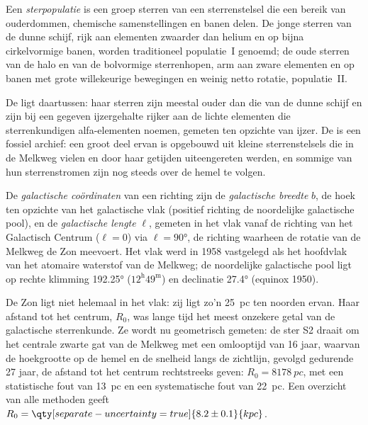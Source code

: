 \begin{definition}[Sterpopulatie]\label{def:b3:milky-way-galaxies:populations}
Een \emph{sterpopulatie} is een groep sterren
van een sterrenstelsel die een bereik van ouderdommen, chemische samenstellingen en
banen delen. De jonge sterren van de dunne schijf, rijk aan elementen zwaarder dan
helium en op bijna cirkelvormige banen, worden traditioneel
populatie~I genoemd; de oude sterren van de halo en van de bolvormige sterrenhopen, arm
aan zware elementen en op banen met grote willekeurige bewegingen en weinig netto rotatie,
populatie~II.
\end{definition}

De  ligt daartussen: haar sterren zijn meestal ouder dan die van
de dunne schijf en zijn bij een gegeven ijzergehalte rijker aan de lichte elementen
die sterrenkundigen alfa-elementen noemen, gemeten ten opzichte van ijzer. De
 is een
fossiel archief: een groot deel ervan is opgebouwd uit kleine sterrenstelsels die in
de Melkweg vielen en door haar getijden uiteengereten werden, en sommige van hun
sterrenstromen zijn nog steeds over de hemel te volgen.

\begin{definition}\label{def:b3:milky-way-galaxies:coordinates}
De \emph{galactische coördinaten} van een richting
zijn de \emph{galactische breedte} $b$, de hoek ten opzichte van het galactische vlak
(positief richting de noordelijke galactische pool), en de \emph{galactische
lengte} $\ell$, gemeten in het vlak vanaf de richting van het
Galactisch Centrum ($\ell = 0$) via $\ell = \ang{90}$, de richting
waarheen de rotatie van de Melkweg de Zon meevoert. Het vlak werd
in 1958 vastgelegd als het hoofdvlak van het atomaire waterstof van de Melkweg;
de noordelijke galactische pool ligt op rechte klimming \ang{192.25}
($12^\mathrm{h}49^\mathrm{m}$) en declinatie \ang{27.4} (equinox
1950).
\end{definition}

De Zon ligt niet helemaal in het vlak: zij ligt zo'n \qty{25}{pc} ten noorden ervan.
Haar afstand tot het centrum, $R_0$, was lange tijd het meest onzekere getal van
de galactische sterrenkunde. Ze wordt nu geometrisch gemeten: de ster S2 draait om
het centrale zwarte gat van de Melkweg met een omlooptijd van \num{16} jaar, waarvan de
hoekgrootte op de hemel en de snelheid langs de zichtlijn, gevolgd
gedurende 27 jaar, de afstand tot het centrum rechtstreeks geven:
$R_0 = \qty{8178}{pc}$, met een statistische fout van \qty{13}{pc} en een systematische
fout van \qty{22}{pc}. Een overzicht van alle methoden geeft
$R_0 = \qty[separate-uncertainty=true]{8.2 \pm 0.1}{kpc}$.

